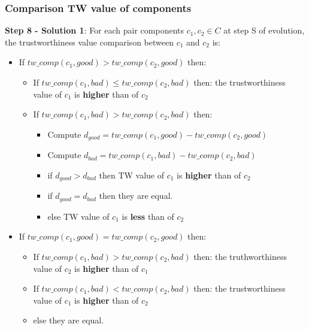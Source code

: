 \documentclass{beamer}
\begin{document}
\begin{frame}[fragile]
	\frametitle{Comparison TW value of components}
		{\bf Step 8 - Solution 1}: For each pair components $c_1, c_2 \in C$ at step S of evolution, the trustworthiness value comparison between $c_1$ and $c_2$ is:
		\begin{itemize}
			\item If $tw\_comp(c_1,good) > tw\_comp(c_2,good)$ then:
			\begin{itemize}
				\item If $tw\_comp(c_1,bad) \leq tw\_comp(c_2,bad)$ then: the trustworthiness value of $c_1$ is {\bf higher} than of $c_2$
				\item If $tw\_comp(c_1,bad) > tw\_comp(c_2,bad)$ then:
				\begin{itemize}
					\item Compute $d_{good} = tw\_comp(c_1,good) - tw\_comp(c_2,good)$
					\item Compute $d_{bad} = tw\_comp(c_1,bad) - tw\_comp(c_2,bad)$
					\item if $d_{good} > d_{bad}$ then TW value of $c_1$ is {\bf higher} than of $c_2$
					\item if $d_{good} = d_{bad}$ then they are equal.
					\item else TW value of $c_1$ is {\bf less} than of $c_2$
				\end{itemize}		
			\end{itemize}
			\item If $tw\_comp(c_1,good) = tw\_comp(c_2,good)$ then:
			\begin{itemize}
				\item If $tw\_comp(c_1,bad) > tw\_comp(c_2,bad)$ then: the truthworthiness value of $c_2$ is {\bf higher} than of $c_1$
				\item If $tw\_comp(c_1,bad) < tw\_comp(c_2,bad)$ then: the trustworthiness value of $c_1$ is {\bf higher} than of $c_2$ 	
				\item else they are equal.
			\end{itemize}
		\end{itemize}
\end{frame}
\end{document}
